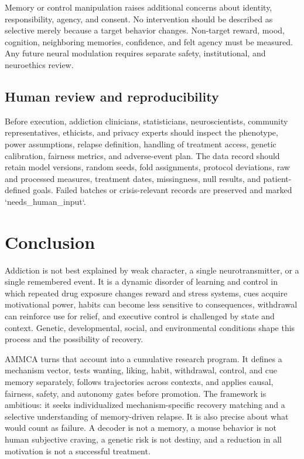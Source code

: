 \documentclass[conference]{IEEEtran}
\begin{document}
Memory or control manipulation raises additional concerns about identity, responsibility, agency, and consent. No intervention should be described as selective merely because a target behavior changes. Non-target reward, mood, cognition, neighboring memories, confidence, and felt agency must be measured. Any future neural modulation requires separate safety, institutional, and neuroethics review.

\subsection{Human review and reproducibility}
Before execution, addiction clinicians, statisticians, neuroscientists, community representatives, ethicists, and privacy experts should inspect the phenotype, power assumptions, relapse definition, handling of treatment access, genetic calibration, fairness metrics, and adverse-event plan. The data record should retain model versions, random seeds, fold assignments, protocol deviations, raw and processed measures, treatment dates, missingness, null results, and patient-defined goals. Failed batches or crisis-relevant records are preserved and marked `needs\_human\_input`.

\section{Conclusion}
Addiction is not best explained by weak character, a single neurotransmitter, or a single remembered event. It is a dynamic disorder of learning and control in which repeated drug exposure changes reward and stress systems, cues acquire motivational power, habits can become less sensitive to consequences, withdrawal can reinforce use for relief, and executive control is challenged by state and context. Genetic, developmental, social, and environmental conditions shape this process and the possibility of recovery.

AMMCA turns that account into a cumulative research program. It defines a mechanism vector, tests wanting, liking, habit, withdrawal, control, and cue memory separately, follows trajectories across contexts, and applies causal, fairness, safety, and autonomy gates before promotion. The framework is ambitious: it seeks individualized mechanism-specific recovery matching and a selective understanding of memory-driven relapse. It is also precise about what would count as failure. A decoder is not a memory, a mouse behavior is not human subjective craving, a genetic risk is not destiny, and a reduction in all motivation is not a successful treatment.
\end{document}
